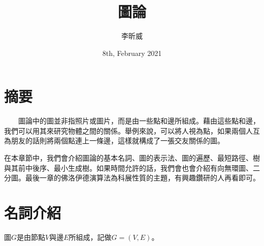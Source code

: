 \newcommand{\problembox}[3]{
    \begin{table}[H]
        \centering
        \begin{tabularx}{\textwidth}{|Xr|}
            \hline
            #1 & #2 \\ \hline
            \multicolumn{2}{|>{\hsize=\dimexpr2\hsize+2\tabcolsep+\arrayrulewidth\relax}X|}{#3} \\ \hline
        \end{tabularx}
    \end{table}
}



\title{圖論}

\author{李昕威} %
\date{8th, February 2021}
\maketitle
\thispagestyle{fancy}

\section{摘要}

　　圖論中的圖並非指照片或圖片，而是由一些點和邊所組成。藉由這些點和邊，我們可以用其來研究物體之間的關係。舉例來說，可以將人視為點，如果兩個人互為朋友的話則將兩個點連上一條邊，這樣就構成了一張交友關係的圖。

在本章節中，我們會介紹圖論的基本名詞、圖的表示法、圖的遍歷、最短路徑、樹與其前中後序、最小生成樹。如果時間允許的話，我們會也會介紹有向無環圖、二分圖。最後一章的佛洛伊德演算法為科展性質的主題，有興趣鑽研的人再看即可。

\section{名詞介紹}
圖$G$是由節點$V$與邊$E$所組成，記做$G=(V, E)$。

